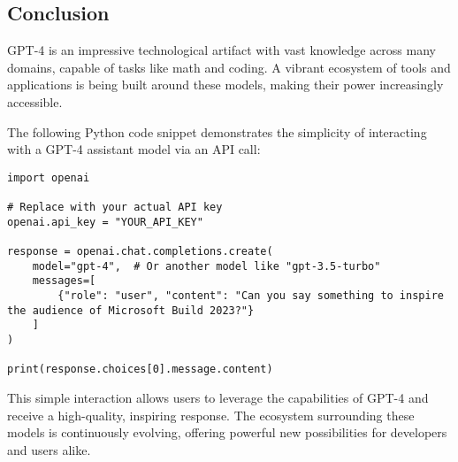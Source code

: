 \subsection{Conclusion}

GPT-4 is an impressive technological artifact with vast knowledge across many domains, capable of tasks like math and coding. A vibrant ecosystem of tools and applications is being built around these models, making their power increasingly accessible.

The following Python code snippet demonstrates the simplicity of interacting with a GPT-4 assistant model via an API call:

\begin{lstlisting}[caption={Basic GPT-4 API Interaction}]
import openai

# Replace with your actual API key
openai.api_key = "YOUR_API_KEY"

response = openai.chat.completions.create(
    model="gpt-4",  # Or another model like "gpt-3.5-turbo"
    messages=[
        {"role": "user", "content": "Can you say something to inspire the audience of Microsoft Build 2023?"}
    ]
)

print(response.choices[0].message.content)
\end{lstlisting}

This simple interaction allows users to leverage the capabilities of GPT-4 and receive a high-quality, inspiring response. The ecosystem surrounding these models is continuously evolving, offering powerful new possibilities for developers and users alike.